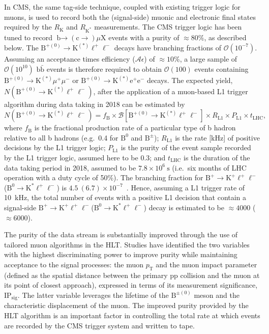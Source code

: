 \documentclass{webofc}
\newcommand{\ellell}{\ensuremath{\ell^+\ell^-}\xspace}
\newcommand{\ee}{\ensuremath{\textrm{e}^+\textrm{e}^-}\xspace}
\newcommand{\mumu}{\ensuremath{\mu^+\mu^-}\xspace}
\newcommand{\bto}{\ensuremath{\textrm{b}{\rightarrow}}\xspace}
\newcommand{\btok}{\ensuremath{\textrm{B}^+{\rightarrow}\textrm{K}^+}\xspace}
\newcommand{\btokst}{\ensuremath{\textrm{B}^0{\rightarrow}\textrm{K}^*}\xspace}
\newcommand{\btokstar}{\ensuremath{\textrm{B}^{+(0)}{\rightarrow}\textrm{K}^{(*)}}\xspace}
\newcommand{\btokll}{\ensuremath{\btok\ellell}\xspace}
\newcommand{\rk}{\ensuremath{R_{\textrm{K}}}\xspace}
\newcommand{\btokstll}{\ensuremath{\btokst\ellell}\xspace}
\newcommand{\rkst}{\ensuremath{R_{\textrm{K}^*}}\xspace}
\newcommand{\btokstarll}{\ensuremath{\btokstar\ellell}\xspace}
\newcommand{\btokstarmm}{\ensuremath{\btokstar\mumu}\xspace}
\newcommand{\btokstaree}{\ensuremath{\btokstar\ee}\xspace}
\newcommand{\btoctomux}{\ensuremath{{\bto}(\textrm{c}{\rightarrow})\mu\textrm{X}}\xspace}
\newcommand{\bbar}{\ensuremath{\textrm{b}\bar{\textrm{b}}}\xspace}
\newcommand{\pt}{\ensuremath{p_\textrm{T}}\xspace}
\newcommand{\ate}{\ensuremath{\mathcal{A}\epsilon}\xspace}
\newcommand{\ipsig}{\ensuremath{\textrm{IP}_{\textrm{sig}}}\xspace}
\begin{document}
In CMS, the same tag-side technique, coupled with existing trigger
logic for muons, is used to record both the (signal-side) muonic and
electronic final states required by the \rk and \rkst measurements.
The CMS trigger logic has been tuned to record \btoctomux events with
a purity of ${\approx}80\%$, as described below. The \btokstarll
decays have branching fractions of $\mathcal{O}(10^{-7})$. Assuming an
acceptance times efficiency (\ate) of ${\approx}10\%$, a large sample
of $\mathcal{O}(10^{10})$ \bbar events is therefore required to obtain
$\mathcal{O}(100)$ events containing \btokstarmm or \btokstaree
decays. The expected yield, $N(\btokstarll)$, after the application of
a muon-based L1 trigger algorithm during data taking in 2018 can be
estimated by %
\begin{equation}
  N(\btokstarll) = f_{\textrm{B}} \times
  \mathcal{B}[\btokstarll] \times R_{\textrm{L1}} \times
  P_{\textrm{L1}} \times t_{\textrm{LHC}},
  \label{equ:2}  
\end{equation}
where $f_{\textrm{B}}$ is the fractional production rate of a
particular type of b hadron relative to all b hadrons (e.g.~0.4 for
$\textrm{B}^0$ and $\textrm{B}^\pm$); $R_{\textrm{L1}}$ is the rate
[kHz] of positive decisions by the L1 trigger logic; $P_{\textrm{L1}}$
is the purity of the event sample recorded by the L1 trigger logic,
assumed here to be 0.3; and $t_{\textrm{LHC}}$ is the duration of the
data taking period in 2018, assumed to be $7.8 \times 10^6~\textrm{s}$
(i.e.~six months of LHC operation with a duty cycle of 50\%). The
branching fraction for \btokll (\btokstll) is $4.5~(6.7) \times
10^{-7}$~\cite{}. Hence, assuming a L1 trigger rate of 10~kHz, the
total number of events with a positive L1 decision that contain a
signal-side \btokll (\btokstll) decay is estimated to be
${\approx}4000$ (${\approx}6000$).

The purity of the data stream is substantially improved through the
use of tailored muon algorithms in the HLT. Studies have identified
the two variables with the highest discriminating power to improve
purity while maintaining acceptance to the signal processes: the muon
\pt and the muon impact parameter (defined as the spatial distance
between the primary pp collision and the muon at its point of closest
approach), expressed in terms of its measurement significance, \ipsig.
The latter variable leverages the lifetime of the
$\textrm{B}^{\pm(0)}$ meson and the characteristic displacement of the
muon. The improved purity provided by the HLT algorithm is an
important factor in controlling the total rate at which events are
recorded by the CMS trigger system and written to tape.
\end{document}
